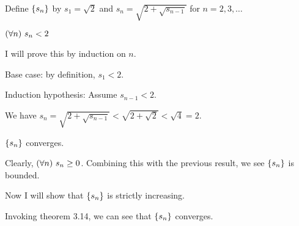 \documentclass[11pt,letterpaper]{article}
\begin{document}
\begin{Problem}{3.3}
\begin{Hypothesis} Define $\left\{ s_n \right\}$ by $s_1 = \sqrt{2}$ and $s_n = \sqrt{2 + \sqrt{s_{n-1}}}$ for $n=2,3,\ldots$ \end{Hypothesis}
\begin{Claim} $\left( \forall n \right) \, s_n < 2$ \end{Claim}
\begin{Proof}
    I will prove this by induction on $n$.
    
    Base case: by definition, $s_1 < 2$.
    
    Induction hypothesis: Assume $s_{n-1} < 2$.
    
    We have $s_n = \sqrt{2 + \sqrt{s_{n-1}}} < \sqrt{2 + \sqrt{2}} < \sqrt{4} = 2$.
\end{Proof}
\begin{Claim} $\left\{ s_n \right\}$ converges. \end{Claim}
\begin{Proof}
    Clearly, $\left( \forall n \right) \,s_n\geq0$. Combining this with the previous result, we see $\left\{ s_n \right\}$ is bounded. 
    
    \begin{Todo} Now I will show that $\left\{ s_n \right\}$ is strictly increasing. \end{Todo}
    
    Invoking theorem 3.14, we can see that $\left\{ s_n \right\}$ converges.
\end{Proof}
\end{Problem}
\end{document}
